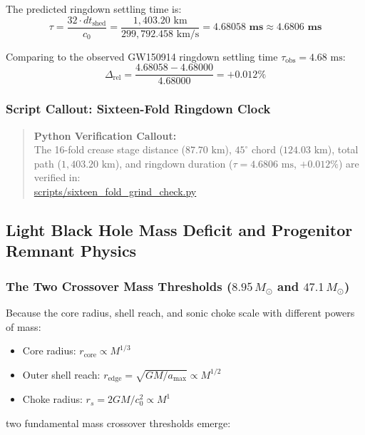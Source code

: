 \documentclass[11pt,a4paper]{article}
\begin{document}
The predicted ringdown settling time is:
\begin{equation}
\tau = \frac{32 \cdot dt_{\text{shed}}}{c_0} = \frac{1,403.20\text{ km}}{299,792.458\text{ km/s}} = \mathbf{4.68058\text{ ms}} \approx \mathbf{4.6806\text{ ms}}
\label{eq:tau_settling_val}
\end{equation}

Comparing to the observed GW150914 ringdown settling time $\tau_{\text{obs}} = 4.68\text{ ms}$:
\begin{equation}
\Delta_{\text{rel}} = \frac{4.68058 - 4.68000}{4.68000} = \mathbf{+0.012\%}
\end{equation}

\subsubsection{Script Callout: Sixteen-Fold Ringdown Clock}
\label{subsubsec:callout_16fold}

\begin{quote}
\textbf{Python Verification Callout:}\\
The 16-fold crease stage distance ($87.70\text{ km}$), $45^\circ$ chord ($124.03\text{ km}$), total path ($1,403.20\text{ km}$), and ringdown duration ($\tau = 4.6806\text{ ms}$, $+0.012\%$) are verified in:\\
\url{scripts/sixteen_fold_grind_check.py}
\end{quote}

\subsection{Light Black Hole Mass Deficit and Progenitor Remnant Physics}
\label{subsec:light_bh_deficit}

\subsubsection{The Two Crossover Mass Thresholds ($8.95\,M_\odot$ and $47.1\,M_\odot$)}
\label{subsubsec:two_crossovers}

Because the core radius, shell reach, and sonic choke scale with different powers of mass:
\begin{itemize}
    \item Core radius: $r_{\text{core}} \propto M^{1/3}$
    \item Outer shell reach: $r_{\text{edge}} = \sqrt{GM/a_{\max}} \propto M^{1/2}$
    \item Choke radius: $r_s = 2GM/c_0^2 \propto M^1$
\end{itemize}
two fundamental mass crossover thresholds emerge:
\end{document}
